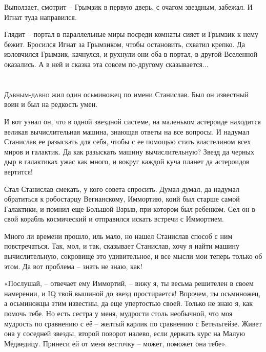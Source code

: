 \documentclass[ebook,oneside,final,openright]{memoir}
\begin{document}
\par
Выползает, смотрит – Грымзик в первую дверь, с очагом звездным, забежал. И Игнат туда направился.\par
\par
Глядит – портал в параллельные миры посреди комнаты сияет и Грымзик к нему бежит. Бросился Игнат за Грымзиком, чтобы остановить, схватил крепко. Да изловчился Грымзик, качнулся, и рухнули они оба в портал, в другой Вселенной оказались. А в ней и сказка эта совсем по-другому сказывается...\par

\chapter{}
 \lettrine{Д}{авным-давно} жил один осьминожец по имени Станислав. Был он известный воин и был на редкость умен.\par
\par
И вот узнал он, что в одной звездной системе, на маленьком астероиде находится великая вычислительная машина, знающая ответы на все вопросы. И надумал Станислав ее разыскать для себя, чтобы с ее помощью стать властелином всех миров и галактик. Да как разыскать машину вычислительную? Звезд да черных дыр в галактиках ужас как много, и вокруг каждой куча планет да астероидов вертится!\par
\par
Стал Станислав смекать, у кого совета спросить. Думал-думал, да надумал обратиться к робостарцу Вегианскому, Иммортию, коий был старше самой Галактики, и помнил еще Большой Взрыв, при котором был ребенком. Сел он в свой корабль космический и отправился искать встречи с Иммортием.\par
\par
Много ли времени прошло, иль мало, но нашел Станислав способ с ним повстречаться. Так, мол, и так, сказывает Станислав, хочу я найти машину вычислительную, сокровище это удивительное, и все мысли мои теперь только об этом. Да вот проблема – знать не знаю, как!\par
\par
«Послушай, – отвечает ему Иммортий, – вижу я, ты весьма решителен в своем намерении, и IQ твой вышиной до звезд простирается! Впрочем, ты осьминожец, а осьминожцы этим известны, да еще упертостью своей. Только не знаю я, как помочь тебе. Но есть сестра у меня, мудрости столь необычной, что моя мудрость по сравнению с её – желтый карлик по сравнению с Бетельгейзе. Живет она у соседней звезды, второй поворот налево, если держать курс на Малую Медведицу. Принеси ей от меня весточку – может, поможет она тебе».\par
\end{document}
